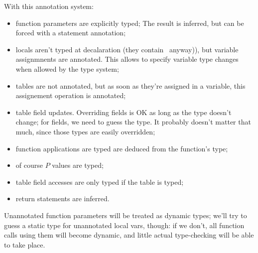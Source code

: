 With this annotation system:
\begin{itemize}
\item function parameters are explicitly typed; The result is
  inferred, but can be forced with a statement annotation;
\item locals aren't typed at decalaration (they contain \Nil\ anyway)),
  but variable assignmnents are annotated. This allows to specify
  variable type changes when allowed by the type system;
\item tables are not annotated, but as soon as they're assigned in a
  variable, this assignement operation is annotated;
\item table field updates. Overriding \Tvar{}fields is OK as long as
  the type doesn't change; for \Tcurrently{}fields, we need to guess
  the type. It probably doesn't matter that much, since those types
  are easily overridden; 
\item function applications are typed are deduced from the function's
  type;
\item of course $P$ values are typed;
\item table field accesses are only typed if the table is typed;
\item return statements are inferred.
\end{itemize}


Unannotated function parameters will be treated as dynamic types;
we'll try to guess a static type for unannotated local vars, though:
if we don't, all function calls using them will become dynamic, and
little actual type-checking will be able to take place.

